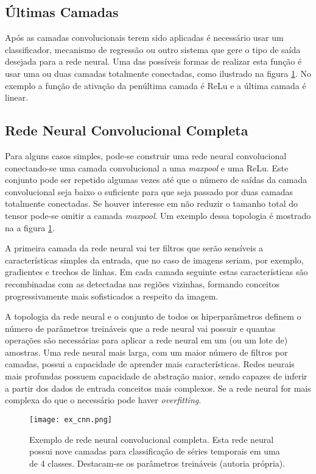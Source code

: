 \subsection{Últimas Camadas}
Após as camadas convolucionais terem sido aplicadas é necessário usar um
classificador, mecanismo de regressão ou outro sistema que gere o tipo de saída
desejada para a rede neural. Uma das possíveis formas de realizar esta função é
usar uma ou duas camadas totalmente conectadas, como ilustrado na figura
\ref{fig:ex_cnn}. No exemplo a função de ativação da penúltima camada é
ReLu e a última camada é linear.

\subsection{Rede Neural Convolucional Completa}
Para alguns casos simples, pode-se construir uma rede neural convolucional
conectando-se uma camada convolucional a uma \emph{maxpool} e uma ReLu. Este
conjunto pode ser repetido algumas vezes até que o número de saídas da camada
convolucional seja baixo o suficiente para que seja passado por duas camadas
totalmente conectadas. Se houver interesse em não reduzir o tamanho total do
tensor pode-se omitir a camada \emph{maxpool}. Um exemplo dessa topologia é
mostrado na a figura \ref{fig:ex_cnn}.

A primeira camada da rede neural vai ter filtros que serão sensíveis a
características simples da entrada, que no caso de imagens seriam, por exemplo,
gradientes e trechos de linhas. Em
cada camada seguinte estas características são recombinadas com as detectadas
nas regiões vizinhas, formando conceitos progressivamente mais sofisticados a
respeito da imagem.

A topologia da rede neural e o conjunto de todos os hiperparâmetros definem o
número de parâmetros treináveis que a rede neural vai possuir e quantas
operações são necessárias para aplicar a rede neural em um (ou um lote de)
amostras. Uma rede neural mais larga, com um maior número de filtros por
camadas, possui a capacidade de aprender mais características. Redes neurais
mais profundas possuem capacidade de abstração maior, sendo capazes de inferir
a partir dos dados de entrada conceitos mais complexos. Se a rede neural for
mais complexa do que o necessário pode haver \emph{overfitting}.

\begin{figure}[!htb]
	\centering
	\texttt{[image: ex\_cnn.png]}
	\caption[Exemplo de rede neural convolucional completa]{
		Exemplo de rede neural convolucional completa.
		Esta rede neural possui nove camadas para
		classificação de séries temporais em uma de 4 classes. Destacam-se os
		parâmetros treináveis (autoria própria).}
	\label{fig:ex_cnn}
\end{figure}

